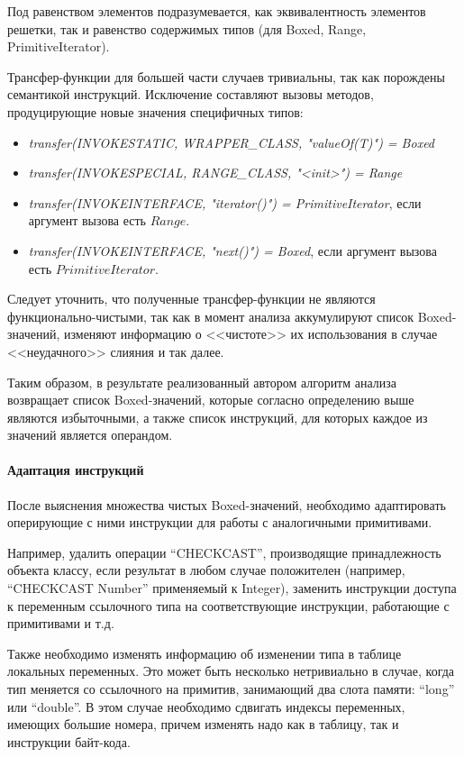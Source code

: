 Под равенством элементов подразумевается, как эквивалентность элементов решетки, так и равенство
содержимых типов (для Boxed, Range, PrimitiveIterator).

Трансфер-функции для большей части случаев тривиальны, так как порождены семантикой инструкций.
Исключение составляют вызовы методов, продуцирующие новые значения специфичных типов:
\begin{itemize}
    \item \textit{transfer(INVOKESTATIC, WRAPPER\_CLASS, "valueOf(T)") = Boxed}
    \item \textit{transfer(INVOKESPECIAL, RANGE\_CLASS, "<init>") = Range}
    \item \textit{transfer(INVOKEINTERFACE, "iterator()") = PrimitiveIterator}, если аргумент вызова есть $Range$.
    \item \textit{transfer(INVOKEINTERFACE, "next()") = Boxed}, если аргумент вызова есть $PrimitiveIterator$.
\end{itemize}

Следует уточнить, что полученные трансфер-функции не являются функционально-чистыми, так как
в момент анализа аккумулируют список Boxed-значений, изменяют информацию о <<чистоте>> их
использования в случае <<неудачного>> слияния и так далее.

Таким образом, в результате реализованный автором алгоритм анализа возвращает список Boxed-значений,
которые согласно определению выше являются избыточными, а также список инструкций, для
которых каждое из значений является операндом.

\paragraph{Адаптация инструкций}
После выяснения множества чистых Boxed-значений, необходимо адаптировать оперирующие
с ними инструкции для работы с аналогичными примитивами.

Например, удалить операции ``CHECKCAST'', производящие принадлежность объекта классу, если результат
в любом случае положителен (например, ``CHECKCAST Number'' применяемый к Integer), заменить
инструкции доступа к переменным ссылочного типа на соответствующие инструкции, работающие
с примитивами и т.д.

Также необходимо изменять информацию об изменении типа в таблице локальных переменных.
Это может быть несколько нетривиально в случае, когда тип меняется со ссылочного на примитив,
занимающий два слота памяти: ``long'' или ``double''.
В этом случае необходимо сдвигать индексы переменных, имеющих большие номера, причем изменять надо
как в таблицу, так и инструкции байт-кода.


